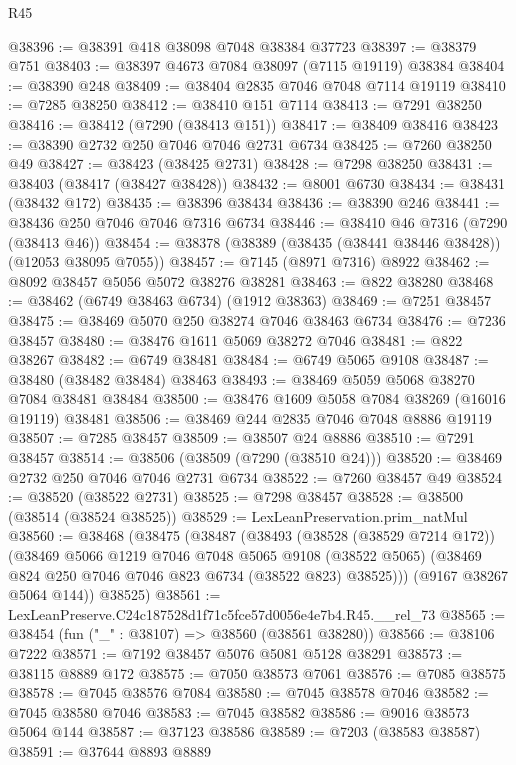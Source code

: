 \begin{lexlean}{R45}
\begin{coremodule}
{@38396 := @38391 @418 @38098 @7048 @38384 @37723
@38397 := @38379 @751
@38403 := @38397 @4673 @7084 @38097 (@7115 @19119) @38384
@38404 := @38390 @248
@38409 := @38404 @2835 @7046 @7048 @7114 @19119
@38410 := @7285 @38250
@38412 := @38410 @151 @7114
@38413 := @7291 @38250
@38416 := @38412 (@7290 (@38413 @151))
@38417 := @38409 @38416
@38423 := @38390 @2732 @250 @7046 @7046 @2731 @6734
@38425 := @7260 @38250 @49
@38427 := @38423 (@38425 @2731)
@38428 := @7298 @38250
@38431 := @38403 (@38417 (@38427 @38428))
@38432 := @8001 @6730
@38434 := @38431 (@38432 @172)
@38435 := @38396 @38434
@38436 := @38390 @246
@38441 := @38436 @250 @7046 @7046 @7316 @6734
@38446 := @38410 @46 @7316 (@7290 (@38413 @46))
@38454 := @38378 (@38389 (@38435 (@38441 @38446 @38428)) (@12053 @38095 @7055))
@38457 := @7145 (@8971 @7316) @8922
@38462 := @8092 @38457 @5056 @5072 @38276 @38281
@38463 := @822 @38280
@38468 := @38462 (@6749 @38463 @6734) (@1912 @38363)
@38469 := @7251 @38457
@38475 := @38469 @5070 @250 @38274 @7046 @38463 @6734
@38476 := @7236 @38457
@38480 := @38476 @1611 @5069 @38272 @7046
@38481 := @822 @38267
@38482 := @6749 @38481
@38484 := @6749 @5065 @9108
@38487 := @38480 (@38482 @38484) @38463
@38493 := @38469 @5059 @5068 @38270 @7084 @38481 @38484
@38500 := @38476 @1609 @5058 @7084 @38269 (@16016 @19119) @38481
@38506 := @38469 @244 @2835 @7046 @7048 @8886 @19119
@38507 := @7285 @38457
@38509 := @38507 @24 @8886
@38510 := @7291 @38457
@38514 := @38506 (@38509 (@7290 (@38510 @24)))
@38520 := @38469 @2732 @250 @7046 @7046 @2731 @6734
@38522 := @7260 @38457 @49
@38524 := @38520 (@38522 @2731)
@38525 := @7298 @38457
@38528 := @38500 (@38514 (@38524 @38525))
@38529 := LexLeanPreservation.prim_natMul
@38560 := @38468
    (@38475
      (@38487
        (@38493
          (@38528 (@38529 @7214 @172))
          (@38469
            @5066
            @1219
            @7046
            @7048
            @5065
            @9108
            (@38522 @5065)
            (@38469 @824 @250 @7046 @7046 @823 @6734 (@38522 @823) @38525)))
        (@9167 @38267 @5064 @144))
      @38525)
@38561 := LexLeanPreserve.C24c187528d1f71c5fce57d0056e4e7b4.R45.__rel_73
@38565 := @38454 (fun ("_" : @38107) => @38560 (@38561 @38280))
@38566 := @38106 @7222
@38571 := @7192 @38457 @5076 @5081 @5128 @38291
@38573 := @38115 @8889 @172
@38575 := @7050 @38573 @7061
@38576 := @7085 @38575
@38578 := @7045 @38576 @7084
@38580 := @7045 @38578 @7046
@38582 := @7045 @38580 @7046
@38583 := @7045 @38582
@38586 := @9016 @38573 @5064 @144
@38587 := @37123 @38586
@38589 := @7203 (@38583 @38587)
@38591 := @37644 @8893 @8889
}
\end{coremodule}
\end{lexlean}
